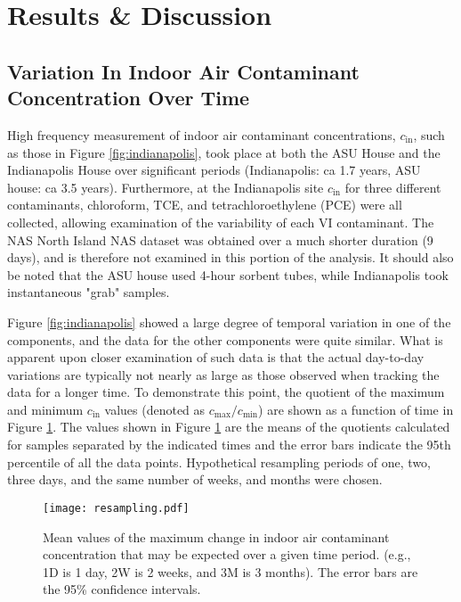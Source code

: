 \documentclass[preprint,12pt]{elsarticle}
\begin{document}
\newpage
\section{Results \& Discussion}\label{s:results}

\subsection{Variation In Indoor Air Contaminant Concentration Over Time}\label{s:results_variation_time}

High frequency measurement of indoor air contaminant concentrations, $c_\mathrm{in}$, such as those in Figure \ref{fig:indianapolis}, took place at both the ASU House and the Indianapolis House over significant periods (Indianapolis: ca 1.7 years, ASU house: ca 3.5 years)\cite{u.s._environmental_protection_agency_assessment_2015,holton_temporal_2013}.
Furthermore, at the Indianapolis site $c_\mathrm{in}$ for three different contaminants, chloroform, TCE, and tetrachloroethylene (PCE) were all collected, allowing examination of the variability of each VI contaminant.
The NAS North Island NAS dataset was obtained over a much shorter duration (9 days), and is therefore not examined in this portion of the analysis.
It should also be noted that the ASU house used 4-hour sorbent tubes, while Indianapolis took instantaneous "grab" samples.\par

Figure \ref{fig:indianapolis} showed a large degree of temporal variation in one of the components, and the data for the other components were quite similar.
What is apparent upon closer examination of such data is that the actual day-to-day variations are typically not nearly as large as those observed when tracking the data for a longer time.
To demonstrate this point, the quotient of the maximum and minimum $c_\mathrm{in}$ values (denoted as $c_\mathrm{max}/c_\mathrm{min}$) are shown as a function of time in Figure \ref{fig:resampling}.
The values shown in Figure \ref{fig:resampling} are the means of the quotients calculated for samples separated by the indicated times and the error bars indicate the 95th percentile of all the data points.
Hypothetical resampling periods of one, two, three days, and the same number of weeks, and months were chosen.\par

\begin{figure}[htb!]
 \centering
 \texttt{[image: resampling.pdf]}
 \caption{Mean values of the maximum change in indoor air contaminant concentration that may be expected over a given time period. (e.g., 1D is 1 day, 2W is 2 weeks, and 3M is 3 months). The error bars are the 95\% confidence intervals.}\label{fig:resampling}
\end{figure}
\end{document}
